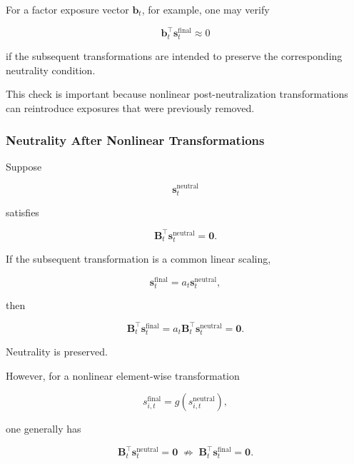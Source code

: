\documentclass[11pt,a4paper]{article}
\begin{document}
For a factor exposure vector $\mathbf{b}_t$, for example, one may verify

\begin{equation}
\mathbf{b}_t^\top
\mathbf{s}_t^{\mathrm{final}}
\approx
0
\end{equation}

if the subsequent transformations are intended to preserve the corresponding
neutrality condition.

This check is important because nonlinear post-neutralization transformations
can reintroduce exposures that were previously removed.


\subsubsection{Neutrality After Nonlinear Transformations}

Suppose

\begin{equation}
\mathbf{s}_t^{\mathrm{neutral}}
\end{equation}

satisfies

\begin{equation}
\mathbf{B}_t^\top
\mathbf{s}_t^{\mathrm{neutral}}
=
\mathbf{0}.
\end{equation}

If the subsequent transformation is a common linear scaling,

\begin{equation}
\mathbf{s}_t^{\mathrm{final}}
=
a_t
\mathbf{s}_t^{\mathrm{neutral}},
\end{equation}

then

\begin{equation}
\mathbf{B}_t^\top
\mathbf{s}_t^{\mathrm{final}}
=
a_t
\mathbf{B}_t^\top
\mathbf{s}_t^{\mathrm{neutral}}
=
\mathbf{0}.
\end{equation}

Neutrality is preserved.

However, for a nonlinear element-wise transformation

\begin{equation}
s_{i,t}^{\mathrm{final}}
=
g
\left(
s_{i,t}^{\mathrm{neutral}}
\right),
\end{equation}

one generally has

\begin{equation}
\boxed{
\mathbf{B}_t^\top
\mathbf{s}_t^{\mathrm{neutral}}
=
\mathbf{0}
\;\not\Rightarrow\;
\mathbf{B}_t^\top
\mathbf{s}_t^{\mathrm{final}}
=
\mathbf{0}.
}
\end{equation}
\end{document}
